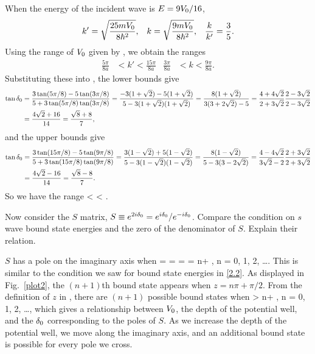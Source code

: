 \begin{solution}
	When the energy of the incident wave is $E = 9 V_0 / 16$,
	\begin{align*}
		k' &= \sqrt{\frac{25 m V_0}{8 \hbar^2}}, &
		k &= \sqrt{\frac{9 m V_0}{8 \hbar^2}}, &
		\frac{k}{k'} = \frac{3}{5}.
	\end{align*}
	Using the range of $V_0$ given by , we obtain the ranges
	\begin{align*}
		\frac{5 \pi}{8 a} &< k' < \frac{15 \pi}{8 a} &
		\frac{3 \pi}{8 a} &< k < \frac{9 \pi}{8 a}.
	\end{align*}
	Substituting these into , the lower bounds give
	\begin{align*}
		\tan\delta_0 &= \frac{3 \tan(5 \pi / 8) - 5 \tan(3\pi / 8)}{5 + 3 \tan(5 \pi / 8) \tan(3\pi / 8)}
		= \frac{-3 (1 + \sqrt{2}) - 5 (1 + \sqrt{2})}{5 - 3 (1 + \sqrt{2}) (1 + \sqrt{2})}
		= \frac{8 (1 + \sqrt{2})}{3(3 + 2 \sqrt{2}) - 5}
		= \frac{4 + 4 \sqrt{2}}{2 + 3 \sqrt{2}} \frac{2 - 3 \sqrt{2}}{2 - 3 \sqrt{2}} \\
		&= \frac{4 \sqrt{2} + 16}{14}
		= \frac{\sqrt{8} + 8}{7},
	\end{align*}
	and the upper bounds give
	\begin{align*}
		\tan\delta_0 &= \frac{3 \tan(15 \pi / 8) - 5 \tan(9\pi / 8)}{5 + 3 \tan(15 \pi / 8) \tan(9\pi / 8)}
		= \frac{3 (1 - \sqrt{2}) + 5 (1 - \sqrt{2})}{5 - 3 (1 - \sqrt{2}) (1 - \sqrt{2})}
		= \frac{8 (1 - \sqrt{2})}{5 - 3 (3 - 2 \sqrt{2})}
		= \frac{4 - 4 \sqrt{2}}{3 \sqrt{2} - 2} \frac{2 + 3 \sqrt{2}}{2 + 3 \sqrt{2}} \\
		&= \frac{4 \sqrt{2} - 16}{14}
		= \frac{\sqrt{8} - 8}{7}.
	\end{align*}
	So we have the range
	\beq
		 < \tan\delo < .
	\eeq
	\vfix
\end{solution}



\begin{problem}
	Now consider the $S$ matrix, $S \equiv e^{2i \delta_0} = e^{i \delta_0} / e^{-i \delta_0}$.  Compare the condition on $s$ wave bound state energies and the zero of the denominator of $S$.  Explain their relation.
\end{problem}

\begin{solution}
	$S$ has a pole on the imaginary axis when
	 = \Re[e^{-i \delo}] =  = \cos\delo
		\qimplies
		\delo = n\pi + , \quad n = 0, 1, 2, \ldots.
	\eeq
	This is similar to the condition we saw for bound state energies in \ref{2.2}.  As displayed in Fig.~\ref{plot2}, the $(n + 1)$th bound state appears when $z = n\pi + \pi / 2$.  From the definition of $z$ in , there are $(n + 1)$ possible bound states when
	\beq
		 > n\pi + , \quad n = 0, 1, 2, \ldots,
	\eeq
	which gives a relationship between $V_0$, the depth of the potential well, and the $\delta_0$ corresponding to the poles of $S$.  As we increase the depth of the potential well, we move along the imaginary axis, and an additional bound state is possible for every pole we cross.
\end{solution}


